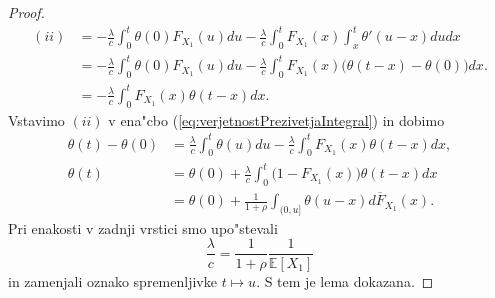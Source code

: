 \documentclass[12pt, a4paper, reqno]{amsart}
\theoremstyle{definition}
\theoremstyle{plain}
\newcommand{\E}{\mathbb{E}}
\newcommand{\1}{\mathds{1}}
\begin{document}
\begin{proof}
        \begin{align*}
            (ii)    &=  - \frac{\lambda}{c}\int_0^t\theta(0)F_{X_1}(u)du - \frac{\lambda}{c}\int_0^tF_{X_1}(x)\int_x^t\theta'(u - x)dudx \\
                    &= - \frac{\lambda}{c}\int_0^t\theta(0)F_{X_1}(u)du - \frac{\lambda}{c}\int_0^tF_{X_1}(x)\bigl(\theta(t-x) - \theta(0)\bigr)dx.\\
                    &= - \frac{\lambda}{c}\int_0^tF_{X_1}(x)\theta(t - x)dx.
        \end{align*}
        Vstavimo $(ii)$ v ena"cbo (\ref{eq:verjetnostPrezivetjaIntegral}) in dobimo
        \begin{align*}
            \theta(t) - \theta(0) &= \frac{\lambda}{c}\int_0^t\theta(u)du - \frac{\lambda}{c}\int_0^tF_{X_1}(x)\theta(t - x)dx,\\
            \theta(t) &= \theta(0) + \frac{\lambda}{c}\int_0^t\bigl(1 - F_{X_1}(x)\bigr)\theta(t - x)dx \\
                    &= \theta(0) + \frac{1}{1 + \rho}\int_{(0, u]}\theta(u - x)d\overline{F}_{X_1}(x).
        \end{align*}
        Pri enakosti v zadnji vrstici smo upo"stevali  
        \begin{equation*}
            \frac{\lambda}{c} = \frac{1}{1 + \rho}\frac{1}{\E\left[X_1\right]}
        \end{equation*}
        in zamenjali oznako spremenljivke $t\mapsto u$. S tem je lema dokazana. 

    \end{proof}
\end{document}
